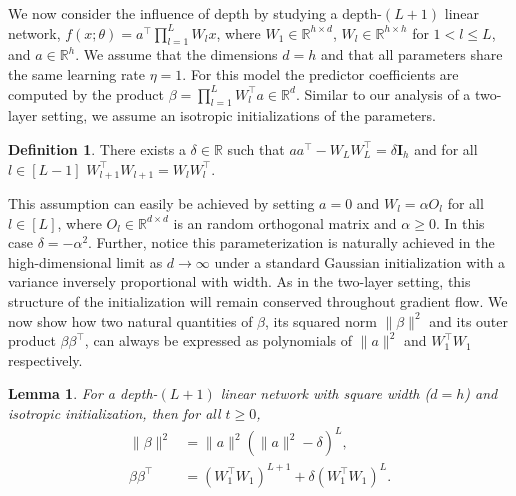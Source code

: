 \documentclass{article}
\theoremstyle{plain}
\newtheorem{lemma}[theorem]{Lemma}
\theoremstyle{definition}
\newtheorem{definition}[theorem]{Definition}
\theoremstyle{remark}
\begin{document}
We now consider the influence of depth by studying a depth-$(L + 1)$ linear network, $f(x;\theta) = a^\intercal \prod_{l=1}^{L} W_l x$, where $W_1 \in \mathbb{R}^{h \times d}$, $W_l \in \mathbb{R}^{h \times h}$ for $1 < l \le L$, and $a \in \mathbb{R}^{h}$. 
%
We assume that the dimensions $d = h$ and that all parameters share the same learning rate $\eta = 1$.
%
For this model the predictor coefficients are computed by the product $\beta = \prod_{l=1}^{L}W_l^\intercal a \in \mathbb{R}^d$.
%
Similar to our analysis of a two-layer setting, we assume an isotropic initializations of the parameters.
%
\begin{definition}
    \label{assump:isotropic-deep}
    There exists a $\delta \in \mathbb{R}$ such that $aa^\intercal - W_LW_L^\intercal = \delta \mathbf{I}_h$ and for all $l \in [L-1]$ $W_{l+1}^\intercal W_{l+1} = W_lW_l^\intercal$.
\end{definition}
%
This assumption can easily be achieved by setting $a = 0$ and $W_l = \alpha O_l$ for all $l \in [L]$,  where $O_l \in \mathbb{R}^{d \times d}$ is an random orthogonal matrix and $\alpha \ge 0$.
%
In this case $\delta = -\alpha^2$.
%
Further, notice this parameterization is naturally  achieved in the high-dimensional limit as $d \to \infty$ under a standard Gaussian initialization with a variance inversely proportional with width.
%
As in the two-layer setting, this structure of the initialization will remain conserved throughout gradient flow.
%
We now show how two natural quantities of $\beta$, its squared norm $\|\beta\|^2$ and its outer product $\beta\beta^\intercal$, can always be expressed as polynomials of $\|a\|^2$ and $W_1^\intercal W_1$ respectively.

\begin{lemma}
    For a depth-$(L+1)$ linear network with square width ($d = h$) and isotropic initialization, then for all $t \ge 0$,
    \begin{align}
        \|\beta\|^2 &= \|a\|^2\left(\|a\|^2 - \delta\right)^{L}, \label{eq:norm-beta-depth-d}\\
        \beta\beta^\intercal &= \left(W_1^\intercal W_1\right)^{L+1} + \delta\left(W_1^\intercal W_1\right)^{L}. \label{eq:outer-product-beta-depth-d}
    \end{align}
\end{lemma}
\end{document}

